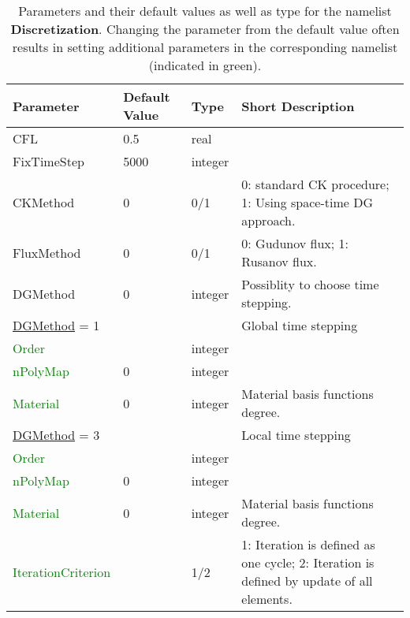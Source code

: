 \documentclass[12pt,twoside]{article}
\begin{document}
\begin{table}[H]
\caption{Parameters and their default values as well as type for the namelist \textbf{Discretization}.
         Changing the parameter from the default value often results in setting additional parameters in the corresponding namelist (indicated in green). }
\begin{center}
\begin{tabular}{|p{4cm}|p{2.7cm}|p{2cm}|p{4cm}|}
\hline
Parameter & Default Value & Type & Short Description \\
\hline
\hline
CFL & 0.5 & real & \\
FixTimeStep & 5000 & integer & \\
CKMethod & 0 & 0/1 & 0: standard CK procedure; 1: Using space-time DG approach.\\
FluxMethod & 0 & 0/1 & 0: Gudunov flux; 1: Rusanov flux.\\
DGMethod & 0 & integer & Possiblity to choose time stepping.\\
\hdashline
\uline{DGMethod} = 1 & & & Global time stepping\\
\textcolor{green}{Order} & & integer & \\
\textcolor{green}{nPolyMap} & 0 & integer & \\
\textcolor{green}{Material} & 0 & integer & Material basis functions degree.\\
\hdashline
\uline{DGMethod} = 3 & & & Local time stepping\\
\textcolor{green}{Order} & & integer & \\
\textcolor{green}{nPolyMap} & 0 & integer & \\
\textcolor{green}{Material} & 0 & integer & Material basis functions degree.\\
\textcolor{green}{IterationCriterion} & & 1/2 & 1: Iteration is defined as one cycle;
2: Iteration is defined by update of all elements.\\
\hline
\end{tabular}
\end{center}
\label{disc-table}
\end{table}
\end{document}
